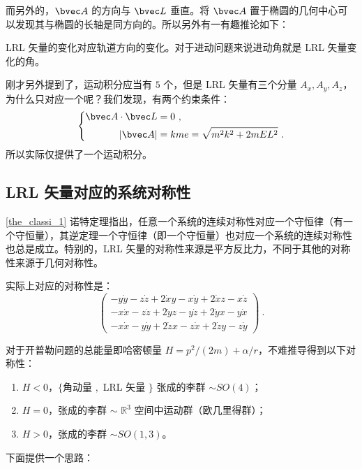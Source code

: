 而另外的，$\bvec A$ 的方向与 $\bvec L$ 垂直。将 $\bvec A$ 置于椭圆的几何中心可以发现其与椭圆的长轴是同方向的。所以另外有一有趣推论如下：
\begin{corollary}{}
LRL 矢量的变化对应轨道方向的变化。对于进动问题来说进动角就是 LRL 矢量变化的角。
\end{corollary}

刚才另外提到了，运动积分应当有 $5$ 个，但是 LRL 矢量有三个分量 $A_x, A_y, A_z$，为什么只对应一个呢？我们发现，有两个约束条件：
\begin{equation}
\left\{
\begin{aligned}
\bvec A \cdot \bvec L &= 0 ~, \\
|\bvec A| &= kme = \sqrt{m^2k^2 + 2m E L^2} ~. 
\end{aligned}
\right.
\end{equation}
所以实际仅提供了一个运动积分。

\subsection{LRL 矢量对应的系统对称性}
\autoref{the_classi_1}  诺特定理指出，任意一个系统的连续对称性对应一个守恒律（有一个守恒量），其逆定理一个守恒律（即一个守恒量）也对应一个系统的连续对称性也总是成立。特别的，LRL 矢量的对称性来源是平方反比力，不同于其他的对称性来源于几何对称性。

实际上对应的对称性是：
\begin{equation}
\begin{pmatrix}
-y\dot y-z\dot z+2\dot x y -x \dot y +2\dot x z-x\dot z \\
-x \dot x - z \dot z + 2 \dot y z - y \dot z + 2 \dot y x - y \dot x \\
-x \dot x - y \dot y + 2 \dot z x - z \dot x + 2 \dot z y - z \dot y 
\end{pmatrix} ~.
\end{equation}

对于开普勒问题的总能量即哈密顿量 $H = p^2/(2m) + \alpha/r$，不难推导得到以下对称性：
\begin{enumerate}
\item $H < 0$，$\{$角动量 $,$ LRL 矢量 $\}$ 张成的李群 $\sim SO(4)$；
\item $H = 0 $，张成的李群 $\sim$ $\mathbb R^3$ 空间中运动群（欧几里得群）；
\item $H > 0$，张成的李群 $\sim SO(1, 3)$。
\end{enumerate}
下面提供一个思路：


